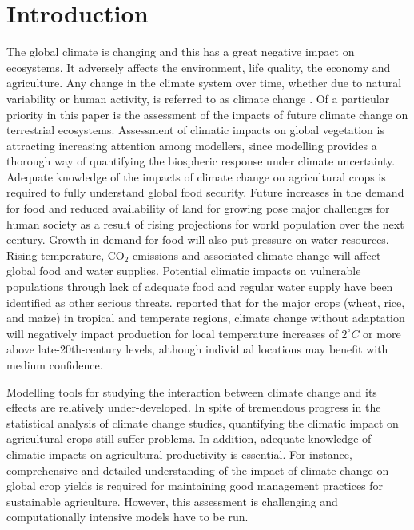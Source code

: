 \section{Introduction}
The global climate is changing and this has a great negative impact on ecosystems. It adversely affects the environment, life quality, the economy and  agriculture. Any change in the climate system over time, whether due to natural variability or human activity, is referred to as climate change \citep{42}. Of a particular priority in this paper is the assessment of the impacts of future climate change on terrestrial ecosystems. Assessment of climatic impacts on global vegetation is attracting increasing attention among modellers, since modelling provides a thorough way of quantifying the biospheric response under climate uncertainty. Adequate knowledge of the impacts of climate change on agricultural crops is required to fully understand global food security.
Future increases in the demand for food and reduced availability of land for growing pose major challenges for human society as a result of rising projections for world population over the next century.
Growth in demand for food will also put pressure on water resources. Rising temperature, CO$_2$ emissions and associated climate change will affect global food and water supplies. Potential climatic impacts on vulnerable populations through lack of adequate food and regular water supply have been identified as other serious threats. 
\citet{ipc14} reported that for the major crops (wheat, rice, and maize) in tropical and temperate regions, climate change without adaptation will negatively impact production for local temperature increases of $2^{\circ}C$ or more above late-20th-century levels, although individual locations may benefit with medium confidence.

Modelling tools for studying the interaction between climate change and its effects are relatively under-developed. In spite of tremendous progress in the statistical analysis of climate change studies, quantifying the climatic impact on agricultural crops still suffer problems. In addition, adequate knowledge of climatic impacts on agricultural productivity is essential. For instance, comprehensive and detailed understanding of the impact of climate change on global crop yields is required for maintaining good management practices for sustainable agriculture. However, this assessment is challenging and computationally intensive models have to be run. 

